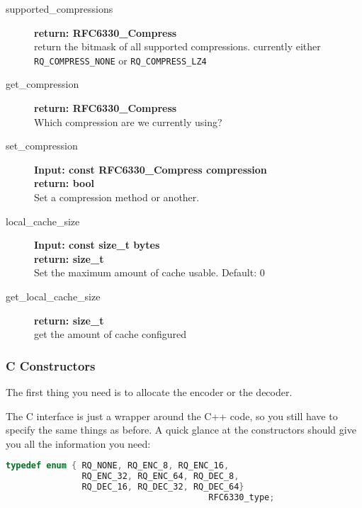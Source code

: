 \documentclass[11pt,a4paper]{refart}
\begin{document}
\begin{description}
\item[supported\_compressions] \textbf{return: RFC6330\_Compress}\\
return the bitmask of all supported compressions. currently either \texttt{RQ\_COMPRESS\_NONE} or \texttt{RQ\_COMPRESS\_LZ4}

\item[get\_compression] \textbf{return: RFC6330\_Compress}\\
Which compression are we currently using?

\item[set\_compression] \textbf{Input: const RFC6330\_Compress compression}\\
\textbf{return: bool}\\
Set a compression method or another.

\item[local\_cache\_size] \textbf{Input: const size\_t bytes}\\
\textbf{return: size\_t}\\
Set the maximum amount of cache usable. Default: $0$
\item[get\_local\_cache\_size] \textbf{return: size\_t}\\
get the amount of cache configured
\end{description}

\subsubsection{C Constructors}
The first thing you need is to allocate the encoder or the decoder.

The C interface is just a wrapper around the C++ code, so you still have to specify the same things as before.
A quick glance at the constructors should give you all the information you need:

\begin{lstlisting}[language=C]
typedef enum { RQ_NONE, RQ_ENC_8, RQ_ENC_16,
               RQ_ENC_32, RQ_ENC_64, RQ_DEC_8,
               RQ_DEC_16, RQ_DEC_32, RQ_DEC_64}
              							RFC6330_type;
\end{lstlisting}
\end{document}
